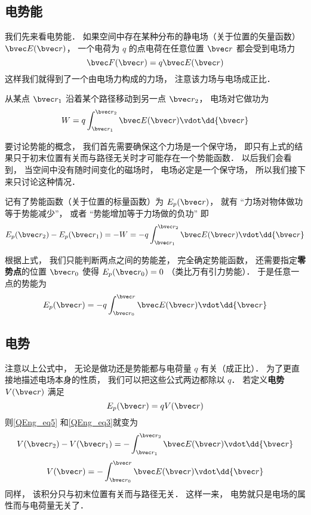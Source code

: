 

\subsection{电势能}
我们先来看电势能． 如果空间中存在某种分布的静电场（关于位置的矢量函数） $\bvec E(\bvec r)$， 一个电荷为 $q$ 的点电荷在任意位置 $\bvec r$ 都会受到电场力
\begin{equation}
\bvec F(\bvec r) = q \bvec E(\bvec r)
\end{equation}
这样我们就得到了一个由电场力构成的力场， 注意该力场与电场成正比． 

从某点 $\bvec r_1$ 沿着某个路径移动到另一点 $\bvec r_2$， 电场对它做功为
\begin{equation}\label{QEng_eq4}
W = q \int_{\bvec r_1}^{\bvec r_2} \bvec E(\bvec r) \vdot \dd{\bvec r}
\end{equation}

要讨论势能的概念， 我们首先需要确保这个力场是一个保守场， 即只有上式的结果只于初末位置有关而与路径无关时才可能存在一个势能函数． 以后我们会看到， 当空间中没有随时间变化的磁场时， 电场必定是一个保守场， %
所以我们接下来只讨论这种情况．

记有了势能函数（关于位置的标量函数）为 $E_p(\bvec r)$， 就有 “力场对物体做功等于势能减少”， 或者 “势能增加等于力场做的负功” 即
\begin{equation}\label{QEng_eq5}
E_p(\bvec r_2) - E_p(\bvec r_1) = -W = -q \int_{\bvec r_1}^{\bvec r_2} \bvec E(\bvec r) \vdot \dd{\bvec r}
\end{equation}

根据上式， 我们只能判断两点之间的势能差， 完全确定势能函数， 还需要指定\textbf{零势点}的位置 $\bvec r_0$ 使得 $E_p(\bvec r_0) = 0$ （类比万有引力势能）． 于是任意一点的势能为
\begin{equation}\label{QEng_eq3}
E_p(\bvec r) = -q \int_{\bvec r_0}^{\bvec r} \bvec E(\bvec r) \vdot \dd{\bvec r}
\end{equation}

\subsection{电势}
注意以上公式中， 无论是做功还是势能都与电荷量 $q$ 有关（成正比）． 为了更直接地描述电场本身的性质， 我们可以把这些公式两边都除以 $q$． 若定义\textbf{电势} $V(\bvec r)$ 满足
\begin{equation}
E_p(\bvec r) = q V(\bvec r)
\end{equation}
则\autoref{QEng_eq5} 和\autoref{QEng_eq3}就变为
\begin{equation}
V(\bvec r_2) - V(\bvec r_1) = - \int_{\bvec r_1}^{\bvec r_2} \bvec E(\bvec r) \vdot \dd{\bvec r}
\end{equation}
\begin{equation}
V(\bvec r) = -\int_{\bvec r_0}^{\bvec r} \bvec E(\bvec r) \vdot \dd{\bvec r}
\end{equation}
同样， 该积分只与初末位置有关而与路径无关． 这样一来， 电势就只是电场的属性而与电荷量无关了．

